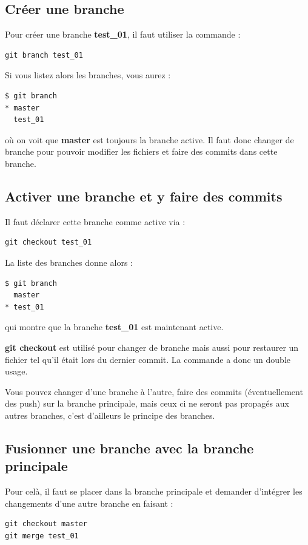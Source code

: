\documentclass[a4paper,twoside]{article}
\begin{document}
\subsection{Créer une branche}
Pour créer une branche \textbf{test\_01}, il faut utiliser la commande :
\begin{verbatim}
git branch test_01
\end{verbatim}

Si vous listez alors les branches, vous aurez :
\begin{verbatim}
$ git branch
* master
  test_01
\end{verbatim}
où on voit que \textbf{master} est toujours la branche active. Il faut donc changer de branche pour pouvoir modifier les fichiers et faire des commits dans cette branche.

\subsection{Activer une branche et y faire des commits}
Il faut déclarer cette branche comme active via :
\begin{verbatim}
git checkout test_01
\end{verbatim}

La liste des branches donne alors :
\begin{verbatim}
$ git branch
  master
* test_01
\end{verbatim}
qui montre que la branche \textbf{test\_01} est maintenant active.

\begin{remarque}
\textbf{git checkout} est utilisé pour changer de branche mais aussi pour restaurer un fichier tel qu'il était lors du dernier commit. La commande a donc un double usage.
\end{remarque}

\begin{attention}
Vous pouvez changer d'une branche à l'autre, faire des commits (éventuellement des push) sur la branche principale, mais ceux ci ne seront pas propagés aux autres branches, c'est d'ailleurs le principe des branches. 
\end{attention}

\subsection{Fusionner une branche avec la branche principale}
Pour celà, il faut se placer dans la branche principale et demander d'intégrer les changements d'une autre branche en faisant : 
\begin{verbatim}
git checkout master
git merge test_01
\end{verbatim}
\end{document}
